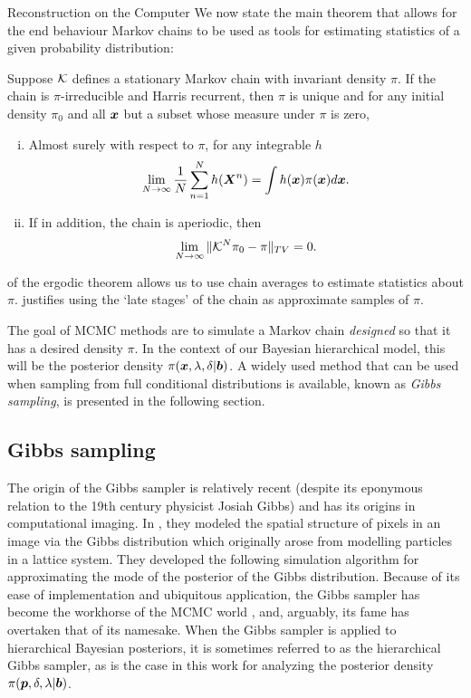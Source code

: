 \begin{chapter}{Reconstruction on the Computer}
We now state the main theorem that allows for the end behaviour Markov chains to be used as tools for estimating statistics of a given probability distribution:
\begin{thm}
  \citep{tierney1994markov} Suppose $\mathcal K$ defines a stationary Markov chain with invariant density $\pi$. If the chain is $\pi$-irreducible and Harris recurrent, then $\pi$ is unique and for any initial density $\pi_0$ and all $\mbox{\boldmath$x$}$ but a subset whose measure under $\pi$ is zero,
  \begin{enumerate}[(i)]
    \item Almost surely with respect to $\pi$, for any integrable $h$ \begin{equation} \lim_{N\to \infty}\frac 1N\sum_{n=1}^N h(\mbox{\boldmath$X$}^n) = \int h(\mbox{\boldmath$x$}) \pi(\mbox{\boldmath$x$}) d\mbox{\boldmath$x$}. \label{eq:ergodicStat}\end{equation}
    \item If in addition, the chain is aperiodic, then \begin{equation} \lim_{N\to \infty}\|\mathcal K^N\pi_0 - \pi\|_{TV} = 0. \label{eq:ergodicDist}\end{equation}
  \end{enumerate}
\end{thm}
 of the ergodic theorem allows us to use chain averages to estimate statistics about $\pi$.  
 justifies using the `late stages' of the chain as approximate samples of $\pi$.

The goal of MCMC methods are to simulate a Markov chain \emph{designed} so that it has a desired density $\pi$.  
In the context of our Bayesian hierarchical model, this will be the posterior density $\pi(\mbox{\boldmath$x$}, \lambda, \delta| \mbox{\boldmath$b$})$.
A widely used method that can be used when sampling from full conditional distributions is available, known as \emph{Gibbs sampling}, is presented in the following section.

\subsection{Gibbs sampling}

The origin of the Gibbs sampler is relatively recent (despite its eponymous relation to the 19th century physicist Josiah Gibbs) and has its origins in computational imaging. 
In \citep{geman1984stochastic}, they modeled the spatial structure of pixels in an image via the Gibbs distribution which originally arose from modelling particles in a lattice system.
They developed the following simulation algorithm for approximating the mode of the posterior of the Gibbs distribution.
Because of its ease of implementation and ubiquitous application, the Gibbs sampler has become the workhorse of the MCMC world \citep{robert2013monte}, and, arguably, its fame has overtaken that of its namesake.
When the Gibbs sampler is applied to hierarchical Bayesian posteriors, it is sometimes referred to as the hierarchical Gibbs sampler, as is the case in this work for analyzing the posterior density $\pi(\mbox{\boldmath$p$},\delta,\lambda|\mbox{\boldmath$b$})$.



\end{chapter}
